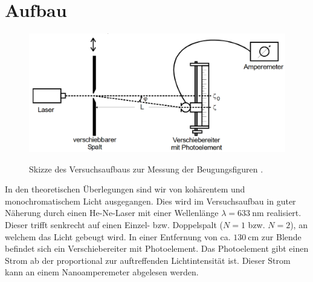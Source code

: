 \section{Aufbau}
\label{sec:Aufbau}
\begin{figure}
	\centering
	\caption{Skizze des Versuchsaufbaus zur Messung der Beugungsfiguren \cite{V406}.}
	\includegraphics[width=\linewidth-150pt,height=\textheight-150pt,keepaspectratio]{content/images/Aufbau.png}
	\label{fig:Aufbau}
\end{figure}
In den theoretischen Überlegungen sind wir von kohärentem und monochromatischem Licht ausgegangen. Dies wird im Versuchsaufbau in guter Näherung durch einen He-Ne-Laser mit einer Wellenlänge $\lambda = \SI{633}{\nano\meter}$ realisiert. Dieser trifft senkrecht auf einen Einzel- bzw. Doppelspalt ($N=1$ bzw. $N=2$), an welchem das Licht gebeugt wird. In einer Entfernung von ca. $\SI{130}{\centi\meter}$ zur Blende befindet sich ein Verschiebereiter mit Photoelement. Das Photoelement gibt einen Strom ab der proportional zur auftreffenden Lichtintensität ist. Dieser Strom kann an einem Nanoamperemeter abgelesen werden.